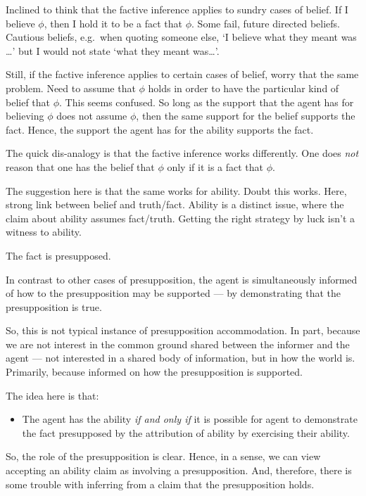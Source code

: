 \documentclass[10pt]{article}
\begin{document}
\begin{note}
  Inclined to think that the factive inference applies to sundry cases of belief.
  If I believe \(\phi\), then I hold it to be a fact that \(\phi\).
  Some fail, future directed beliefs.
  Cautious beliefs, e.g.\ when quoting someone else, `I believe what they meant was \dots' but I would not state `what they meant was\dots'.

  Still, if the factive inference applies to certain cases of belief, worry that the same problem.
  Need to assume that \(\phi\) holds in order to have the particular kind of belief that \(\phi\).
  This seems confused.
  So long as the support that the agent has for believing \(\phi\) does not assume \(\phi\), then the same support for the belief supports the fact.
  Hence, the support the agent has for the ability supports the fact.

  The quick dis-analogy is that the factive inference works differently.
  One does \emph{not} reason that one has the belief that \(\phi\) only if it is a fact that \(\phi\).

  The suggestion here is that the same works for ability.
  Doubt this works.
  Here, strong link between belief and truth/fact.
  Ability is a distinct issue, where the claim about ability assumes fact/truth.
  Getting the right strategy by luck isn't a witness to ability.

  The fact is presupposed.

  In contrast to other cases of presupposition, the agent is simultaneously informed of how to the presupposition may be supported --- by demonstrating that the presupposition is true.

  So, this is not typical instance of presupposition accommodation.
  In part, because we are not interest in the common ground shared between the informer and the agent --- not interested in a shared body of information, but in how the world is.
  Primarily, because informed on how the presupposition is supported.

  The idea here is that:
  \begin{itemize}
  \item The agent has the ability \emph{if and only if} it is possible for agent to demonstrate the fact presupposed by the attribution of ability by exercising their ability.
  \end{itemize}

  So, the role of the presupposition is clear.
  Hence, in a sense, we can view accepting an ability claim as involving a presupposition.
  And, therefore, there is some trouble with inferring from a claim that the presupposition holds.


\end{note}
\end{document}
